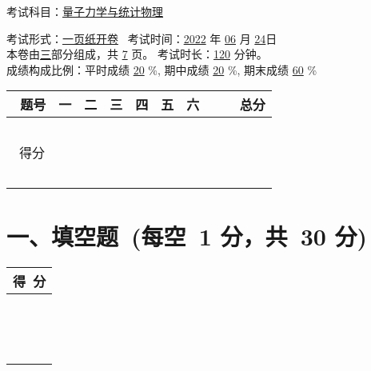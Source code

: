 \documentclass[answers]{exam}
\begin{document}
\begin{LARGE}
\noindent 考试科目：\underline{量子力学与统计物理} \
\end{LARGE} 
考试形式：\underline{一页纸开卷} \
考试时间：\underline{2022} 年 \underline{06} 月 \underline{24}日 \\ {\vspace*{0.3em}}
本卷由\underline{\hspace*{0.5em}三\hspace*{0.5em}}部分组成，共 \underline{\hspace*{0.5em}7\hspace*{0.5em}} 页。 考试时长：\underline{\hspace*{0.5em}120\hspace*{0.5em}} 分钟。\\ {\vspace*{0.3em}}
成绩构成比例：平时成绩 \underline{\hspace*{0.5em}20\hspace*{0.5em}} \%, 期中成绩 \underline{\hspace*{0.5em}20\hspace*{0.5em}} \%, 期末成绩 \underline{\hspace*{0.5em}60\hspace*{0.5em}} \%  \\ 
\begin{table}[htb]   
\begin{center}  
\renewcommand{\arraystretch}{1.5} 
\begin{tabular}{|m{1.5cm}<{\centering}|m{1.0cm}<{\centering}|m{1.0cm}<{\centering}|m{1.0cm}<{\centering}|m{1.0cm}<{\centering}|m{1.0cm}<{\centering}|m{1.0cm}<{\centering}|m{1.0cm}<{\centering}|m{1.5cm}<{\centering}|}   
\hline   ~题号 & 一 & 二 & 三 & 四 & 五 & 六 & ~ &~总分  \\ 
\hline ~ & ~ & ~ & ~ & ~ & ~ & ~ & ~ & ~ \\    
   ~得分 & ~ & ~ & ~ & ~ & ~ & ~ & ~ & ~ \\   
  ~ & ~ & ~ & ~ & ~ & ~ & ~ & ~  & ~\\ 
\hline   
\end{tabular}   
\end{center}   
\end{table}

\section{\hspace{4cm} 一、填空题~(每空~1 分，共~30 分)}
\vspace{-2.1cm}

\begin{table}[htb]   
    \renewcommand{\arraystretch}{1.5} 
    \begin{tabular}{|m{2.5cm}<{\centering}|}   
    \hline  得~分 \\ 
    \hline ~ \\  ~  \\  ~ \\ 
    \hline   
    \end{tabular}     
\end{table}

\clearpage
\end{document}
